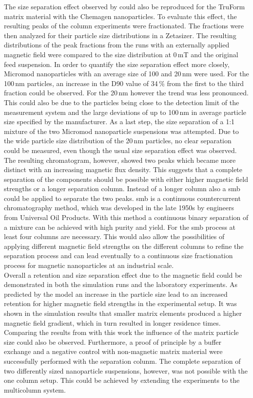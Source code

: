 The size separation effect observed by \cite{AndreMaster} could also be reproduced for the TruForm matrix material with the Chemagen nanoparticles. To evaluate this effect, the resulting peaks of the column experiments were fractionated. The fractions were then analyzed for their particle size distributions in a Zetasizer. The resulting distributions of the peak fractions from the runs with an externally applied magnetic field were compared to the size distribution at 0\,mT and the original feed suspension. In order to quantify the size separation effect more closely, Micromod nanoparticles with an average size of 100 and 20\,nm were used. For the 100\,nm particles, an increase in the D90 value of 34\,\% from the first to the third fraction could be observed. For the 20\,nm however the trend was less pronounced. This could also be due to the particles being close to the detection limit of the measurement system and the large deviations of up to 100\,nm in average particle size specified by the manufacturer. As a last step, the size separation of a 1:1 mixture of the two Micromod nanoparticle suspensions was attempted. Due to the wide particle size distribution of the 20\,nm particles, no clear separation could be measured, even though the usual size separation effect was observed. The resulting chromatogram, however, showed two peaks which became more distinct with an increasing magnetic flux density. This suggests that a complete separation of the components should be possible with either higher magnetic field strengths or a longer separation column. Instead of a longer column also a \gls{smb} could be applied to separate the two peaks. \Gls{smb} is a continuous countercurrent chromatography method, which was developed in the late 1950s by engineers from Universal Oil Products\cite{broughton1961continuous,carson1962rotary}. With this method a continuous binary separation of a mixture can be achieved with high purity and yield. For the \gls{smb} process at least four columns are necessary. This would also allow the possibilities of applying different magnetic field strengths on the different columns to refine the separation process and can lead eventually to a continuous size fractionation process for magnetic nanoparticles at an industrial scale.\\

Overall a retention and size separation effect due to the magnetic field could be demonstrated in both the simulation runs and the laboratory experiments. As predicted by the model an increase in the particle size lead to an increased retention for higher magnetic field strengths in the experimental setup. It was shown in the simulation results that smaller matrix elements produced a higher magnetic field gradient, which in turn resulted in longer residence times. Comparing the results from \cite{AndreMaster} with this work the influence of the matrix particle size could also be observed. Furthermore, a proof of principle by a buffer exchange and a negative control with non-magnetic matrix material were successfully performed with the separation colunm. The complete separation of two differently sized nanoparticle suspensions, however, was not possible with the one column setup. This could be achieved by extending the experiments to the multicolumn system.     